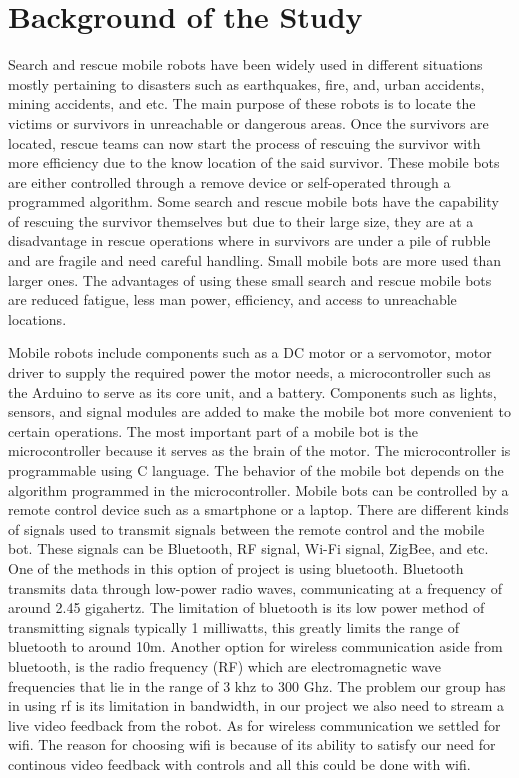 \section{Background of the Study}
 Search and rescue mobile robots have been widely used in different situations mostly pertaining to disasters such as earthquakes, fire, and, urban accidents, mining accidents, and etc. The main purpose of these robots is to locate the victims or survivors in unreachable or dangerous areas. Once the survivors are located, rescue teams can now start the process of rescuing the survivor with more efficiency due to the know location of the said survivor. These mobile bots are either controlled through a remove device or self-operated through a programmed algorithm.  Some search and rescue mobile bots have the capability of rescuing the survivor themselves but due to their large size, they are at a disadvantage in rescue operations where in survivors are under a pile of rubble and are fragile and need careful handling. Small mobile bots are more used than larger ones. The advantages of using these small search and rescue mobile bots are reduced fatigue, less man power, efficiency, and access to unreachable locations. 
 \par \indent
 Mobile robots include components such as a DC motor or a servomotor, motor driver to supply the required power the motor needs, a microcontroller such as the Arduino to serve as its core unit, and a battery. Components such as lights, sensors, and signal modules are added to make the mobile bot more convenient to certain operations. The most important part of a mobile bot is the microcontroller because it serves as the brain of the motor. The microcontroller is programmable using C language. The behavior of the mobile bot depends on the algorithm programmed in the microcontroller. Mobile bots can be controlled by a remote control device such as a smartphone or a laptop. There are different kinds of signals used to transmit signals between the remote control and the mobile bot. These signals can be Bluetooth, RF signal, Wi-Fi signal, ZigBee, and etc. One of the methods in this option of project is using bluetooth. Bluetooth transmits data through low-power radio waves, communicating at a frequency of around 2.45 gigahertz. The limitation of bluetooth is its low power method of transmitting signals typically 1 milliwatts, this greatly limits the range of bluetooth to around 10m. Another option for wireless communication aside from bluetooth, is the radio frequency (RF) which are electromagnetic wave frequencies that lie in the range of 3 khz to 300 Ghz. The problem our group has in using rf is its limitation in bandwidth, in our project we also need to stream a live video feedback from the robot. As for wireless communication we settled for wifi. The reason for choosing wifi is because of its ability to satisfy our need for continous video feedback with controls and all this could be done with wifi. 




